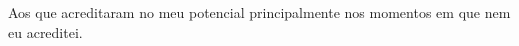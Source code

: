\begin{dedicatoria}
   \vspace*{\fill}

{%
	\noindent\hspace{.5\textwidth}
	{\begin{minipage}{.5\textwidth}
			\begin{flushleft}
				Aos que acreditaram no meu potencial principalmente nos momentos em que nem eu acreditei.
			\end{flushleft}
	\end{minipage}}%
\vspace*{3cm}
}%

\end{dedicatoria}

